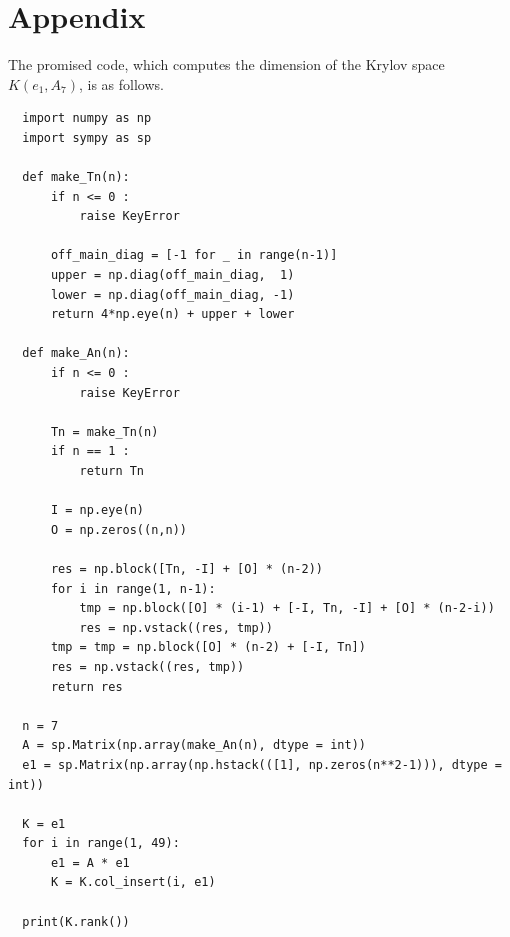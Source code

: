 \documentclass{article}
\begin{document}
\section*{Appendix}
The promised code, which computes the dimension of the Krylov space $K(e_1, A_7)$, is as follows. 

\begin{lstlisting}
  import numpy as np
  import sympy as sp
  
  def make_Tn(n):
      if n <= 0 :
          raise KeyError
      
      off_main_diag = [-1 for _ in range(n-1)]
      upper = np.diag(off_main_diag,  1)
      lower = np.diag(off_main_diag, -1)
      return 4*np.eye(n) + upper + lower
  
  def make_An(n):
      if n <= 0 :
          raise KeyError
  
      Tn = make_Tn(n)
      if n == 1 :
          return Tn
  
      I = np.eye(n)
      O = np.zeros((n,n))
  
      res = np.block([Tn, -I] + [O] * (n-2)) 
      for i in range(1, n-1):
          tmp = np.block([O] * (i-1) + [-I, Tn, -I] + [O] * (n-2-i))
          res = np.vstack((res, tmp))
      tmp = tmp = np.block([O] * (n-2) + [-I, Tn])
      res = np.vstack((res, tmp))
      return res
  
  n = 7
  A = sp.Matrix(np.array(make_An(n), dtype = int))
  e1 = sp.Matrix(np.array(np.hstack(([1], np.zeros(n**2-1))), dtype = int))
  
  K = e1
  for i in range(1, 49):
      e1 = A * e1
      K = K.col_insert(i, e1)
  
  print(K.rank())
  
  \end{lstlisting}
\end{document}
